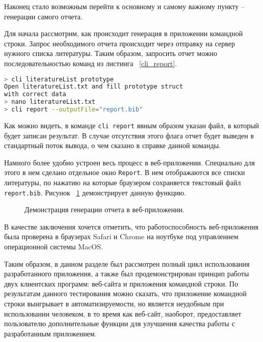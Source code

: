Наконец стало возможным перейти к основному и самому важному пункту -- генерации самого отчета.

Для начала рассмотрим, как происходит генерация в приложении командной строки. Запрос необходимого отчета
происходит через отправку на сервер нужного списка литературы. Таким образом, запросить отчет можно последовательностью
команд из листинга ~\ref{cli_report}.

\begin{lstlisting}[language=bash, caption = {Запрос отчета в приложении командной строки.}, captionpos=b, label={cli_report}]
> cli literatureList prototype
Open literatureList.txt and fill prototype struct 
with correct data
> nano literatureList.txt
> cli report --outputFile="report.bib"
\end{lstlisting}

Как можно видеть, в команде \texttt{cli report} явным образом указан файл, в который будет записан результат. В случае
отсутствия этого флага отчет будет выведен в стандартный поток вывода, о чем сказано в справке данной команды.

Намного более удобно устроен весь процесс в веб-приложении. Специально для этого в нем сделано отдельное окно \texttt{Report}.
В нем отображаются все списки литературы, по нажатию на которые браузером сохраняется текстовый файл \texttt{report.bib}.
Рисунок ~\ref{web_report} демонстрирует данную функцию.

\begin{figure}[h!]
	\caption{Демонстрация генерации отчета в веб-приложении.}
	\label{web_report}
\end{figure}

В качестве заключения хочется отметить, что работоспособность веб-приложения была проверена в браузерах Safari и Chrome на ноутбуке
под управлением операционной системы MacOS.

Таким образом, в данном разделе был рассмотрен полный цикл использования разработанного приложения, а также был продемонстрирован
принцип работы двух клиентских программ: веб-сайта и приложения командной строки. По результатам данного тестирования можно сказать, что
приложение командной строки выигрывает в автоматизируемости, но является неудобным при использовании человеком, в то время как 
веб-сайт, наоборот, предоставляет пользователю дополнительные функции для улучшения качества работы с разработанным приложением.
